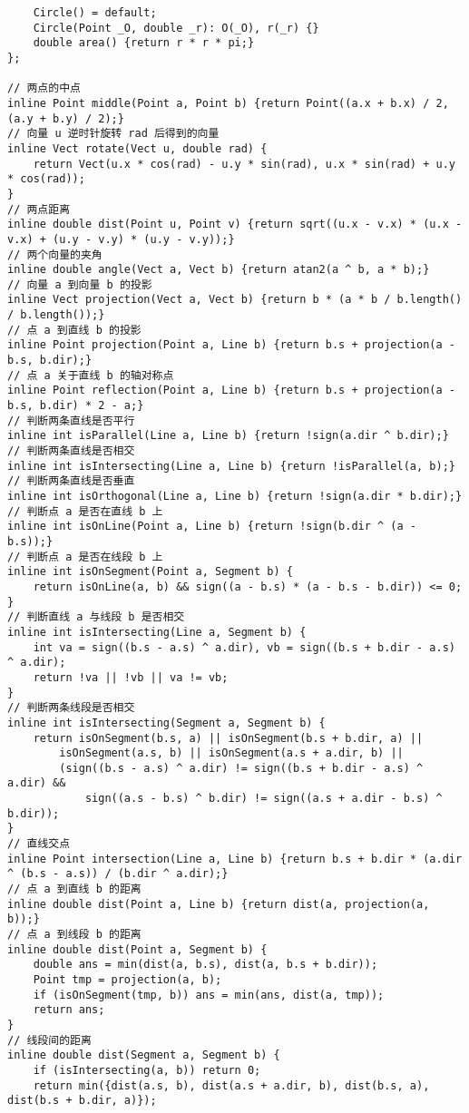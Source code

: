 \begin{verbatim}
    Circle() = default;
    Circle(Point _O, double _r): O(_O), r(_r) {}
    double area() {return r * r * pi;}
};

// 两点的中点
inline Point middle(Point a, Point b) {return Point((a.x + b.x) / 2, (a.y + b.y) / 2);}
// 向量 u 逆时针旋转 rad 后得到的向量
inline Vect rotate(Vect u, double rad) {
    return Vect(u.x * cos(rad) - u.y * sin(rad), u.x * sin(rad) + u.y * cos(rad));
}
// 两点距离
inline double dist(Point u, Point v) {return sqrt((u.x - v.x) * (u.x - v.x) + (u.y - v.y) * (u.y - v.y));}
// 两个向量的夹角
inline double angle(Vect a, Vect b) {return atan2(a ^ b, a * b);}
// 向量 a 到向量 b 的投影
inline Vect projection(Vect a, Vect b) {return b * (a * b / b.length() / b.length());}
// 点 a 到直线 b 的投影
inline Point projection(Point a, Line b) {return b.s + projection(a - b.s, b.dir);}
// 点 a 关于直线 b 的轴对称点
inline Point reflection(Point a, Line b) {return b.s + projection(a - b.s, b.dir) * 2 - a;}
// 判断两条直线是否平行
inline int isParallel(Line a, Line b) {return !sign(a.dir ^ b.dir);}
// 判断两条直线是否相交
inline int isIntersecting(Line a, Line b) {return !isParallel(a, b);}
// 判断两条直线是否垂直
inline int isOrthogonal(Line a, Line b) {return !sign(a.dir * b.dir);}
// 判断点 a 是否在直线 b 上
inline int isOnLine(Point a, Line b) {return !sign(b.dir ^ (a - b.s));}
// 判断点 a 是否在线段 b 上
inline int isOnSegment(Point a, Segment b) {
    return isOnLine(a, b) && sign((a - b.s) * (a - b.s - b.dir)) <= 0;
}
// 判断直线 a 与线段 b 是否相交
inline int isIntersecting(Line a, Segment b) {
    int va = sign((b.s - a.s) ^ a.dir), vb = sign((b.s + b.dir - a.s) ^ a.dir);
    return !va || !vb || va != vb;
}
// 判断两条线段是否相交
inline int isIntersecting(Segment a, Segment b) {
    return isOnSegment(b.s, a) || isOnSegment(b.s + b.dir, a) ||
        isOnSegment(a.s, b) || isOnSegment(a.s + a.dir, b) ||
        (sign((b.s - a.s) ^ a.dir) != sign((b.s + b.dir - a.s) ^ a.dir) &&
            sign((a.s - b.s) ^ b.dir) != sign((a.s + a.dir - b.s) ^ b.dir));
}
// 直线交点
inline Point intersection(Line a, Line b) {return b.s + b.dir * (a.dir ^ (b.s - a.s)) / (b.dir ^ a.dir);}
// 点 a 到直线 b 的距离
inline double dist(Point a, Line b) {return dist(a, projection(a, b));}
// 点 a 到线段 b 的距离
inline double dist(Point a, Segment b) {
    double ans = min(dist(a, b.s), dist(a, b.s + b.dir));
    Point tmp = projection(a, b);
    if (isOnSegment(tmp, b)) ans = min(ans, dist(a, tmp));
    return ans;
}
// 线段间的距离
inline double dist(Segment a, Segment b) {
    if (isIntersecting(a, b)) return 0;
    return min({dist(a.s, b), dist(a.s + a.dir, b), dist(b.s, a), dist(b.s + b.dir, a)});

\end{verbatim}
